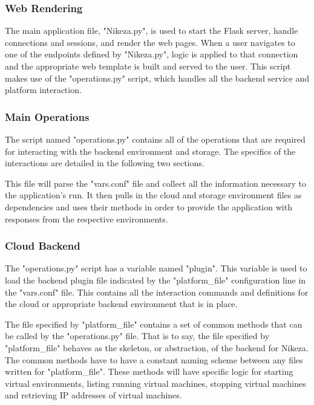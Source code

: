 \subsubsection{Web Rendering}

The main application file, "Nikeza.py", is used to start the Flask server, handle connections and sessions, and render the web pages. When a user navigates to one of the endpoints defined by "Nikeza.py", logic is applied to that connection and the appropriate web template is built and served to the user. This script makes use of the "operations.py" script, which handles all the backend service and platform interaction.

\subsubsection{Main Operations}

The script named "operations.py" contains all of the operations that are required for interacting with the backend environment and storage. The specifics of the interactions are detailed in the following two sections.

This file will parse the "vars.conf" file and collect all the information necessary to the application's run. It then pulls in the cloud and storage environment files as dependencies and uses their methods in order to provide the application with responses from the respective environments.

\subsubsection{Cloud Backend}

The "operations.py" script has a variable named "plugin". This variable is used to load the backend plugin file indicated by the "platform\_file" configuration line in the "vars.conf" file. This contains all the interaction commands and definitions for the cloud or appropriate backend environment that is in place. 

The file specified by "platform\_file" contains a set of common methods that can be called by the "operations.py" file. That is to say, the file specified by "platform\_file" behaves as the skeleton, or abstraction, of the backend for Nikeza. The common methods have to have a constant naming scheme between any files written for "platform\_file". These methods will have specific logic for starting virtual environments, listing running virtual machines, stopping virtual machines and retrieving IP addresses of virtual machines.

